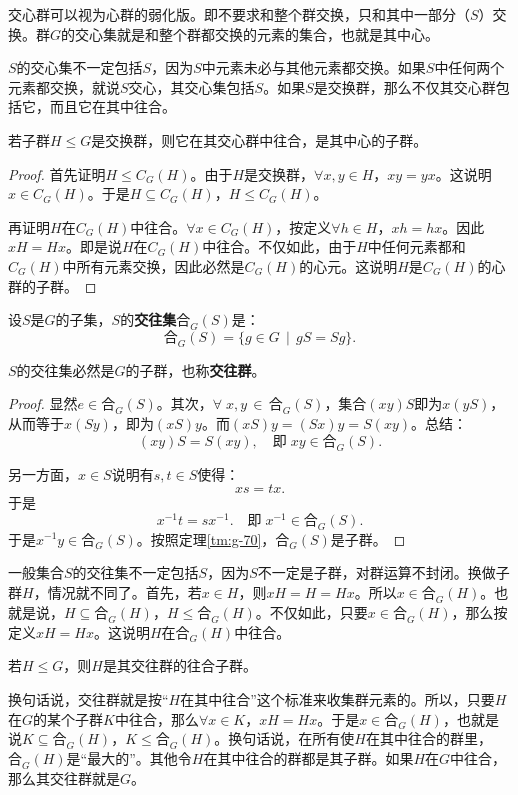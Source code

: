 \documentclass[12pt,UTF8,fontset=none]{ctexbook}
\begin{document}
交心群可以视为心群的弱化版。即不要求和整个群交换，只和其中一部分（$S$）交换。群$G$的交心集就是和整个群都交换的元素的集合，也就是其中心。

$S$的交心集不一定包括$S$，因为$S$中元素未必与其他元素都交换。如果$S$中任何两个元素都交换，就说$S$交心，其交心集包括$S$。如果$S$是交换群，那么不仅其交心群包括它，而且它在其中往合。
\begin{tm}
    若子群$H\leq G$是交换群，则它在其交心群中往合，是其中心的子群。
\end{tm}
\begin{proof}
    首先证明$H \leq C_G(H)$。由于$H$是交换群，$\forall x, y\in H$，$xy = yx$。这说明$x\in C_G(H)$。于是$H\subseteq C_G(H)$，$H\leq C_G(H)$。

    再证明$H$在$C_G(H)$中往合。$\forall x\in C_G(H)$，按定义$\forall h\in H$，$xh = hx$。因此$xH = Hx$。即是说$H$在$C_G(H)$中往合。不仅如此，由于$H$中任何元素都和$C_G(H)$中所有元素交换，因此必然是$C_G(H)$的心元。这说明$H$是$C_G(H)$的心群的子群。
\end{proof}

\begin{df}
    设$S$是$G$的子集，$S$的\textbf{交往集}$\text{合}_G(S)$是：
    $$ \text{合}_G(S) = \{g\in G \, \mid \, gS = Sg\}.  $$
\end{df}

\begin{tm}
    $S$的交往集必然是$G$的子群，也称\textbf{交往群}。
\end{tm}
\begin{proof}
    显然$e\in \text{合}_G(S)$。其次，$\forall \; x, y\,\in\, \text{合}_G(S)$，集合$(xy)S$即为$x(yS)$，从而等于$x(Sy)$，即为$(xS)y$。而$(xS)y = (Sx)y = S(xy)$。总结：
    $$ (xy)S = S(xy),\quad \mbox{即}\; xy\in \text{合}_G(S). $$

    另一方面，$x \in S$说明有$s,t\in S$使得：
    $$ xs = tx. $$
    于是
    $$ x^{-1}t = sx^{-1}.\quad \mbox{即}\; x^{-1}\in \text{合}_G(S). $$
    于是$x^{-1}y\in \text{合}_G(S)$。按照定理\ref{tm:g-70}，$\text{合}_G(S)$是子群。
\end{proof}

一般集合$S$的交往集不一定包括$S$，因为$S$不一定是子群，对群运算不封闭。换做子群$H$，情况就不同了。首先，若$x\in H$，则$xH = H = Hx$。所以$x\in\text{合}_G(H)$。也就是说，$H\subseteq\text{合}_G(H)$，$H\leq\text{合}_G(H)$。不仅如此，只要$x\in \text{合}_G(H)$，那么按定义$xH = Hx$。这说明$H$在$\text{合}_G(H)$中往合。
\begin{pp}
    若$H \leq G$，则$H$是其交往群的往合子群。
\end{pp}
换句话说，交往群就是按“$H$在其中往合”这个标准来收集群元素的。所以，只要$H$在$G$的某个子群$K$中往合，那么$\forall x\in K$，$xH = Hx$。于是$x\in \text{合}_G(H)$，也就是说$K\subseteq \text{合}_G(H)$，$K\leq \text{合}_G(H)$。换句话说，在所有使$H$在其中往合的群里，$\text{合}_G(H)$是“最大的”。其他令$H$在其中往合的群都是其子群。如果$H$在$G$中往合，那么其交往群就是$G$。
\end{document}
